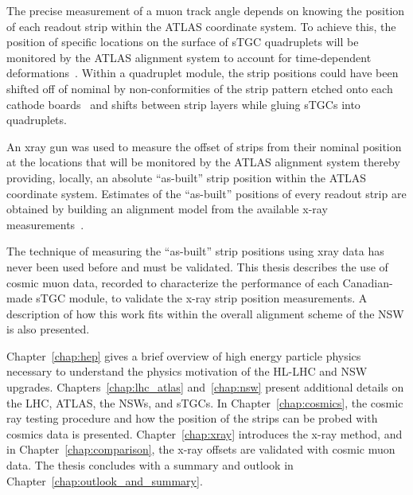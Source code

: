 The precise measurement of  a muon track angle depends on knowing the position of each readout strip within the  ATLAS coordinate system.  To achieve this, the position of specific locations on the surface of sTGC quadruplets will be monitored by the ATLAS alignment system to account for time-dependent deformations~\cite{nsw_tdr}. Within a quadruplet module, the strip positions could have been shifted off of nominal by non-conformities of the strip pattern etched onto each cathode boards~\cite{carlson_results_2019} and shifts between strip layers while gluing sTGCs into quadruplets.

An xray gun was used to measure the offset of strips from their nominal position at the locations that will be monitored by the ATLAS alignment system thereby providing, locally, an absolute “as-built” strip position within the ATLAS coordinate system.  Estimates of the “as-built” positions of every readout strip are obtained by building an alignment model from the available x-ray measurements~\cite{lefebvre_precision_2020}.

The technique of measuring the “as-built” strip positions using xray data has never been used before and must be validated. This thesis describes the use of cosmic muon data, recorded to characterize the performance of each Canadian-made sTGC module, to validate the x-ray strip position measurements.  A description of how this work fits within the overall alignment scheme of the NSW is also presented. 

Chapter~\ref{chap:hep} gives a brief overview of high energy particle physics necessary to understand the physics motivation of the HL-LHC and NSW upgrades. Chapters~\ref{chap:lhc_atlas} and~\ref{chap:nsw} present additional details on the LHC, ATLAS, the NSWs, and sTGCs. In Chapter~\ref{chap:cosmics}, the cosmic ray testing procedure and how the position of the strips can be probed with cosmics data is presented. Chapter~\ref{chap:xray} introduces the x-ray method, and in Chapter~\ref{chap:comparison}, the x-ray offsets are validated with cosmic muon data. The thesis concludes with a summary and outlook in Chapter~\ref{chap:outlook_and_summary}.

